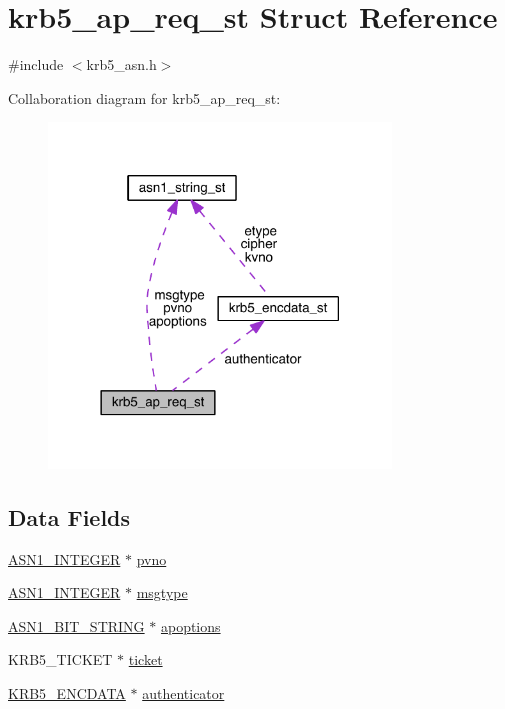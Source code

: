 \hypertarget{structkrb5__ap__req__st}{}\section{krb5\+\_\+ap\+\_\+req\+\_\+st Struct Reference}
\label{structkrb5__ap__req__st}


{\ttfamily \#include $<$krb5\+\_\+asn.\+h$>$}



Collaboration diagram for krb5\+\_\+ap\+\_\+req\+\_\+st\+:\nopagebreak
\begin{figure}[H]
\begin{center}
\leavevmode
\includegraphics[width=258pt]{structkrb5__ap__req__st__coll__graph}
\end{center}
\end{figure}
\subsection*{Data Fields}
\begin{DoxyCompactItemize}
\item 
\hyperlink{crypto_2ossl__typ_8h_af4335399bf9774cb410a5e93de65998b}{A\+S\+N1\+\_\+\+I\+N\+T\+E\+G\+ER} $\ast$ \hyperlink{structkrb5__ap__req__st_a5c73dcaf31ec0dfedb5137e383de258e}{pvno}
\item 
\hyperlink{crypto_2ossl__typ_8h_af4335399bf9774cb410a5e93de65998b}{A\+S\+N1\+\_\+\+I\+N\+T\+E\+G\+ER} $\ast$ \hyperlink{structkrb5__ap__req__st_a28f12d5a6aec5c9acc80d545cc5471c5}{msgtype}
\item 
\hyperlink{crypto_2ossl__typ_8h_af837aaa00e151b1e8773aea5a8fe1cc4}{A\+S\+N1\+\_\+\+B\+I\+T\+\_\+\+S\+T\+R\+I\+NG} $\ast$ \hyperlink{structkrb5__ap__req__st_abe838e2d3723fdbd7743504db6fc420b}{apoptions}
\item 
K\+R\+B5\+\_\+\+T\+I\+C\+K\+ET $\ast$ \hyperlink{structkrb5__ap__req__st_a836b8bce7aabd280b235c1fb6a2e6336}{ticket}
\item 
\hyperlink{crypto_2krb5_2krb5__asn_8h_ad2eb70d74bfb579f1ef3fd6082cffd32}{K\+R\+B5\+\_\+\+E\+N\+C\+D\+A\+TA} $\ast$ \hyperlink{structkrb5__ap__req__st_a740653bd5aaa3d47bc2af3d1566aa51d}{authenticator}
\end{DoxyCompactItemize}


